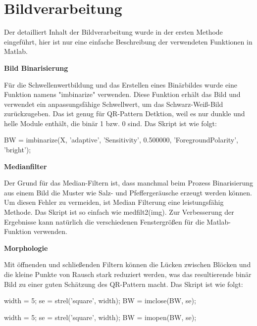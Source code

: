 \section{Bildverarbeitung} 
Der detailliert Inhalt der Bildverarbeitung wurde in der ersten Methode eingeführt, hier ist nur eine einfache Beschreibung der verwendeten Funktionen in Matlab.

\textbf{Bild Binarisierung}

Für die Schwellenwertbildung und das Erstellen eines Binärbildes wurde eine Funktion namens "imbinarize" verwenden. Diese Funktion erhält das Bild und verwendet ein anpassungsfähige Schwellwert, um das Schwarz-Weiß-Bild zurückzugeben. Das ist genug für QR-Pattern Detktion, weil es nur dunkle und helle Module enthält, die binär 1 bzw. 0 sind. Das Skript ist wie folgt:

\singlespacing
\begin{matlab}[firstnumber=1, name=MATLABCodeBeispiel, caption={MATLAB Code Binarisierung}, label={lst:MATLABCodeBinarisierung}]

BW = imbinarize(X, 'adaptive', 'Sensitivity', 0.500000, 'ForegroundPolarity', 'bright');

\end{matlab}
\onehalfspacing

\textbf{Medianfilter}

Der Grund für das Median-Filtern ist, dass manchmal beim Prozess Binarisierung aus einem Bild die Muster wie Salz- und Pfeffergeräusche erzeugt werden können. Um diesen Fehler zu vermeiden, ist Median Filterung eine leistungsfähig Methode. Das Skript ist so einfach wie medfilt2(img). Zur Verbesserung der Ergebnisse kann natürlich die verschiedenen Fenstergrößen für die Matlab-Funktion verwenden.

\textbf{Morphologie}

Mit öffnenden und schließenden Filtern können die Lücken zwischen Blöcken und die kleine Punkte von Rausch stark reduziert werden, was das resultierende binär Bild zu einer guten Schätzung des QR-Pattern macht. Das Skript ist wie folgt:

\singlespacing
\begin{matlab}[firstnumber=1, name=MATLABCodeBeispiel, caption={MATLAB Code Beispiel}, label={lst:MATLABCodeBeispiel}]
width = 5;
se = strel('square', width);
BW = imclose(BW, se);

width = 5;
se = strel('square', width);
BW = imopen(BW, se);

\end{matlab}
\onehalfspacing


